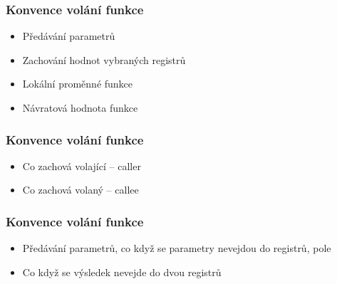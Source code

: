 \documentclass{beamer}
\begin{document}
\begin{frame}
\frametitle{Konvence volání funkce}

\begin{itemize}
 \item Předávání parametrů 
 \item Zachování hodnot vybraných registrů
 \item Lokální proměnné funkce
 \item Návratová hodnota funkce
\end{itemize}
\end{frame}


\begin{frame}
\frametitle{Konvence volání funkce}

\begin{itemize}
 \item Co zachová volající -- caller 
 \item Co zachová volaný -- callee
\end{itemize}
\end{frame}

\begin{frame}
\frametitle{Konvence volání funkce}

\begin{itemize}
 \item Předávání parametrů, co když se parametry nevejdou do registrů, pole
 \item Co když se výsledek nevejde do dvou registrů 
\end{itemize}
\end{frame}
\end{document}
